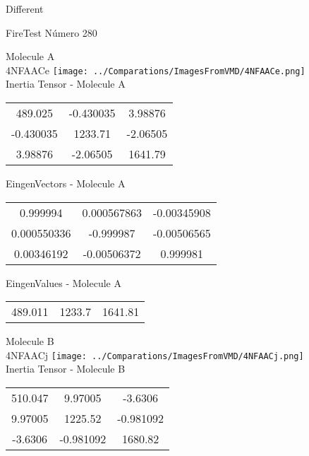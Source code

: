 \begin{center}
\vtab
\vtab
\textcolor{NavyBlue}{\Large Different}
\end{center}

 \newpage

\vtab[-2cm]
\begin{center}
{\large FireTest \tab Número 280}
\end{center}
\begin{multicols}{2}
\begin{center}

Molecule A \\ 
4NFAACe
\texttt{[image: ../Comparations/ImagesFromVMD/4NFAACe.png]}
\\
Inertia Tensor - Molecule A \\
\vtab

\begin{tabular}{|c c c|}
489.025	 & 	-0.430035	 & 	3.98876	 \\
-0.430035	 & 	1233.71	 & 	-2.06505	 \\
3.98876	 & 	-2.06505	 & 	1641.79
\end{tabular}

\vtab
 EingenVectors - Molecule A     \\
\vtab
\begin{tabular}{|c c c|}
0.999994	 & 	0.000567863	 & 	-0.00345908	 \\
0.000550336	 & 	-0.999987	 & 	-0.00506565	 \\
0.00346192	 & 	-0.00506372	 & 	0.999981
\end{tabular}

\vtab
 EingenValues - Molecule A     \\
\vtab
\begin{tabular}{|c c c|}
489.011	 & 	1233.7	 & 	1641.81	 \\
\end{tabular}
\columnbreak

Molecule B \\ 
4NFAACj
\texttt{[image: ../Comparations/ImagesFromVMD/4NFAACj.png]}
\\
Inertia Tensor - Molecule B \\
\vtab

\begin{tabular}{|c c c|}
510.047	 & 	9.97005	 & 	-3.6306	 \\
9.97005	 & 	1225.52	 & 	-0.981092	 \\
-3.6306	 & 	-0.981092	 & 	1680.82
\end{tabular}


\end{center}
\end{multicols}
